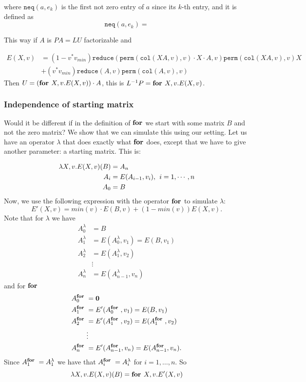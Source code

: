 where $\texttt{neq}(a, e_k)$ is the first not zero entry of $a$ since its $k$-th entry, and it is defined as $$\texttt{neq}(a, e_k)=$$

This way if $A$ is $PA=LU$ factorizable and 

\begin{align*}
	E(X, v)&=(1-v^*v_{min})\texttt{reduce}(\texttt{perm}(\texttt{col}(XA,v),v) \cdot X \cdot A,v) \texttt{perm}(\texttt{col}(XA,v),v)X \\
	&+ (v^*v_{min})\texttt{reduce}(A,v)\texttt{perm}(\texttt{col}(A,v),v)
\end{align*}
Then $U=(\textbf{for } X, v.E(X,v))\cdot A$, this is $L^{-1}P=\textbf{for } X, v.E(X,v)$.

\subsubsection{Independence of starting matrix}

Would it be different if in the definition of $\textbf{for }$we start with some matrix $B$ and not the zero matrix? We show that we can simulate this using our setting. Let us have an operator $\lambda$ that does exactly what $\textbf{for }$does, except that we have to give another parameter: a starting matrix. This is:

\begin{align*}
\lambda X, v.E(X,v)(B)&=A_n \\
A_i&=E(A_{i-1}, v_{i}),\hspace{1ex}i=1,\cdots, n \\
A_0&=B
\end{align*}
Now, we use the following expression with the operator $\textbf{for }$to simulate $\lambda$: $$E'(X,v)=min(v)\cdot E(B,v)+(1-min(v))E(X,v).$$
Note that for $\lambda$ we have 
\begin{align*}
	A^{\lambda}_0&=B \\
	A^{\lambda}_1&=E(A^{\lambda}_0,v_1)=E(B,v_1) \\
	A^{\lambda}_2&=E(A^{\lambda}_1,v_2) \\
	&\vdots \\
	A^{\lambda}_n&=E(A^{\lambda}_{n-1}, v_n)
\end{align*}
and for $\textbf{for }$
\begin{align*}
	A^{\textbf{for }}_0&=\mathbf{0} \\
	A^{\textbf{for }}_1&=E'(A^{\textbf{for }}_0,v_1)=E(B,v_1) \\
	A^{\textbf{for }}_2&=E'(A^{\textbf{for }}_1,v_2)=E(A^{\textbf{for }}_1,v_2) \\
	&\vdots \\
	A^{\textbf{for }}_n&=E'(A^{\textbf{for }}_{n-1}, v_n)=E(A^{\textbf{for }}_{n-1}, v_n).
\end{align*}
Since $A^{\textbf{for }}_1=A^{\lambda}_1$ we have that $A^{\textbf{for }}_i=A^{\lambda}_i$ for $i=1,\ldots,n$. So $$\lambda X, v.E(X,v)(B)=\textbf{for } X, v.E'(X,v)$$